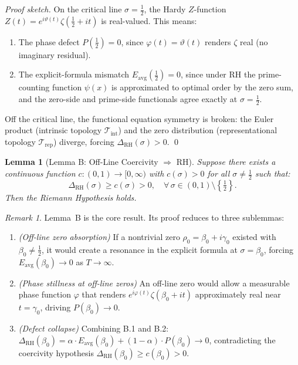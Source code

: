 \documentclass[11pt]{article}
\newtheorem{lemma}[theorem]{Lemma}
\theoremstyle{remark}
\newtheorem{remark}[theorem]{Remark}
\begin{document}
\begin{proof}[Proof sketch]
On the critical line $\sigma = \tfrac{1}{2}$, the Hardy $Z$-function $Z(t) = e^{i\vartheta(t)} \zeta(\tfrac{1}{2} + it)$ is real-valued. This means:
\begin{enumerate}
  \item The phase defect $P(\tfrac{1}{2}) = 0$, since $\varphi(t) = \vartheta(t)$ renders $\zeta$ real (no imaginary residual).
  \item The explicit-formula mismatch $E_{\mathrm{avg}}(\tfrac{1}{2}) = 0$, since under RH the prime-counting function $\psi(x)$ is approximated to optimal order by the zero sum, and the zero-side and prime-side functionals agree exactly at $\sigma = \tfrac{1}{2}$.
\end{enumerate}
Off the critical line, the functional equation symmetry is broken: the Euler product (intrinsic topology $\mathcal{T}_{\mathrm{int}}$) and the zero distribution (representational topology $\mathcal{T}_{\mathrm{rep}}$) diverge, forcing $\Delta_{\mathrm{RH}}(\sigma) > 0$. \qed
\end{proof}


\begin{lemma}[Lemma B: Off-Line Coercivity $\Rightarrow$ RH]
\label{lem:rh-B}
Suppose there exists a continuous function $c: (0,1) \to [0,\infty)$ with $c(\sigma) > 0$ for all $\sigma \neq \tfrac{1}{2}$ such that:
\[
  \Delta_{\mathrm{RH}}(\sigma) \geq c(\sigma) > 0, \quad \forall\, \sigma \in (0,1) \setminus \left\{\tfrac{1}{2}\right\}.
\]
Then the Riemann Hypothesis holds.
\end{lemma}

\begin{remark}
Lemma~B is the core result. Its proof reduces to three sublemmas:
\begin{enumerate}
  \item[\textbf{B.1}] \emph{(Off-line zero absorption)} If a nontrivial zero $\rho_0 = \beta_0 + i\gamma_0$ existed with $\beta_0 \neq \tfrac{1}{2}$, it would create a resonance in the explicit formula at $\sigma = \beta_0$, forcing $E_{\mathrm{avg}}(\beta_0) \to 0$ as $T \to \infty$.
  \item[\textbf{B.2}] \emph{(Phase stillness at off-line zeros)} An off-line zero would allow a measurable phase function $\varphi$ that renders $e^{i\varphi(t)} \zeta(\beta_0 + it)$ approximately real near $t = \gamma_0$, driving $P(\beta_0) \to 0$.
  \item[\textbf{B.3}] \emph{(Defect collapse)} Combining B.1 and B.2: $\Delta_{\mathrm{RH}}(\beta_0) = \alpha \cdot E_{\mathrm{avg}}(\beta_0) + (1-\alpha) \cdot P(\beta_0) \to 0$, contradicting the coercivity hypothesis $\Delta_{\mathrm{RH}}(\beta_0) \geq c(\beta_0) > 0$.
\end{enumerate}
\end{remark}
\end{document}
